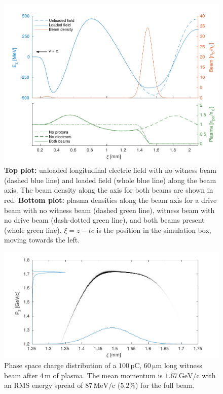 \documentclass[aps,prstab,reprint,amsmath,amssymb,groupedaddress]{revtex4-1}
\newcommand{\unit}[1]{\,\mathrm{#1}}
\begin{document}
\begin{figure}[hbt]
    \includegraphics[width=\linewidth,trim={2mm 0mm 2mm 0mm},clip]{figures/beamLoading}
    \caption{\label{Fig:BeamLoading} \textbf{Top plot:} unloaded longitudinal electric field with no witness beam
        (dashed blue line) and loaded field (whole blue line) along the beam axis. The beam density along the axis for
        both beams are shown in red.
        \textbf{Bottom plot:} plasma densities along the beam axis for a drive beam with no witness beam (dashed green
        line), witness beam with no drive beam (dash-dotted green line), and both beams present (whole green line).
        $\xi = z - tc$ is the position in the simulation box, moving towards the left.}
\end{figure}

\begin{figure}[hbt]
    \includegraphics[width=\linewidth,trim={2mm 0mm 2mm 0mm},clip]{figures/beamPhaseSpace}
    \caption{\label{Fig:BeamPS} Phase space charge distribution of a $100\unit{pC}$, $60\unit{\mu m}$ long witness beam
        after $4\unit{m}$ of plasma. The mean momentum is $1.67\unit{GeV/c}$ with an RMS energy spread
        of $87\unit{MeV/c}$ ($5.2\%$) for the full beam.}
\end{figure}
\end{document}
